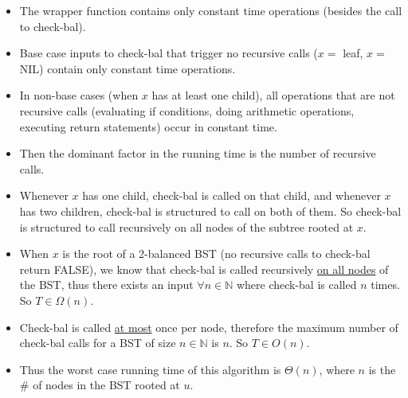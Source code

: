 \documentclass[11pt]{article}
\begin{document}
\begin{itemize}
\item The wrapper function contains only constant time operations (besides the call to check-bal).
\item Base case inputs to check-bal that trigger no recursive calls ($x=$ leaf, $x=$ NIL) contain only constant time operations.
\item In non-base cases (when $x$ has at least one child), all operations that are not recursive calls (evaluating if conditions, doing arithmetic operations, executing return statements) occur in constant time.
\item Then the dominant factor in the running time is the number of recursive calls.
\item Whenever $x$ has one child, check-bal is called on that child, and whenever $x$ has two children, check-bal is structured to call on both of them. So check-bal is structured to call recursively on all nodes of the subtree rooted at $x$. 
\item When $x$ is the root of a 2-balanced BST (no recursive calls to check-bal return FALSE), we know that check-bal is called recursively \underline{on all nodes} of the BST, thus there exists an input $\forall n \in \mathbb{N}$ where check-bal is called $n$ times. So $T \in \Omega(n)$.
\item Check-bal is called \underline{at most} once per node, therefore the maximum number of check-bal calls for a BST of size $n \in \mathbb{N}$ is $n$. So $T \in O(n)$.
\item Thus the worst case running time of this algorithm is $\Theta(n)$, where $n$ is the $\#$ of nodes in the BST rooted at $u$.


\end{itemize}

\newpage
\end{document}
